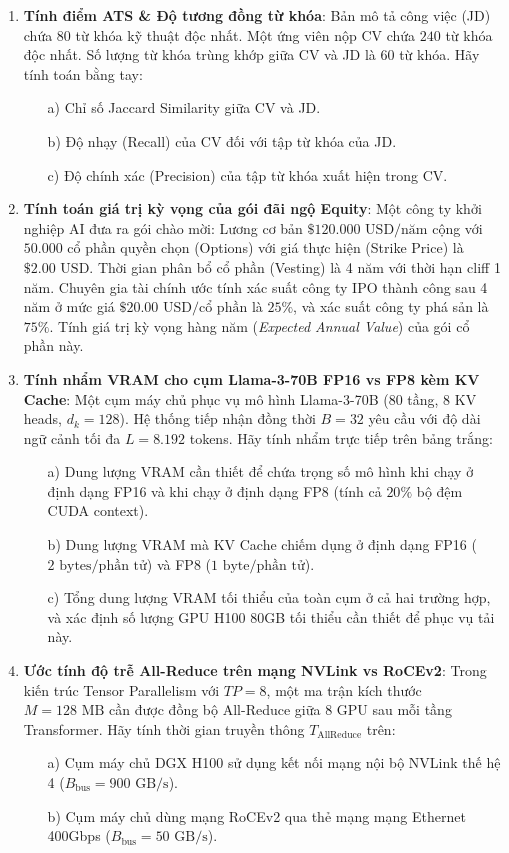 \begin{enumerate}[label=\textbf{B\arabic*.}]
  \item \textbf{Tính điểm ATS \& Độ tương đồng từ khóa}:
  Bản mô tả công việc (JD) chứa $80$ từ khóa kỹ thuật độc nhất.
  Một ứng viên nộp CV chứa $240$ từ khóa độc nhất. Số lượng từ khóa trùng khớp giữa CV và JD là $60$ từ khóa.
  Hãy tính toán bằng tay:
  \begin{itemize}
    \item[a)] Chỉ số Jaccard Similarity giữa CV và JD.
    \item[b)] Độ nhạy (Recall) của CV đối với tập từ khóa của JD.
    \item[c)] Độ chính xác (Precision) của tập từ khóa xuất hiện trong CV.
  \end{itemize}

  \item \textbf{Tính toán giá trị kỳ vọng của gói đãi ngộ Equity}:
  Một công ty khởi nghiệp AI đưa ra gói chào mời: Lương cơ bản $\$120.000\text{ USD/năm}$ cộng với $50.000$ cổ phần quyền chọn (Options) với giá thực hiện (Strike Price) là $\$2.00\text{ USD}$. Thời gian phân bổ cổ phần (Vesting) là 4 năm với thời hạn cliff 1 năm.
  Chuyên gia tài chính ước tính xác suất công ty IPO thành công sau 4 năm ở mức giá $\$20.00\text{ USD/cổ phần}$ là $25\%$, và xác suất công ty phá sản là $75\%$. Tính giá trị kỳ vọng hàng năm (\textit{Expected Annual Value}) của gói cổ phần này.

  \item \textbf{Tính nhẩm VRAM cho cụm Llama-3-70B FP16 vs FP8 kèm KV Cache}:
  Một cụm máy chủ phục vụ mô hình Llama-3-70B (80 tầng, 8 KV heads, $d_k = 128$).
  Hệ thống tiếp nhận đồng thời $B = 32$ yêu cầu với độ dài ngữ cảnh tối đa $L = 8.192$ tokens.
  Hãy tính nhẩm trực tiếp trên bảng trắng:
  \begin{itemize}
    \item[a)] Dung lượng VRAM cần thiết để chứa trọng số mô hình khi chạy ở định dạng FP16 và khi chạy ở định dạng FP8 (tính cả $20\%$ bộ đệm CUDA context).
    \item[b)] Dung lượng VRAM mà KV Cache chiếm dụng ở định dạng FP16 ($2\text{ bytes/phần tử}$) và FP8 ($1\text{ byte/phần tử}$).
    \item[c)] Tổng dung lượng VRAM tối thiểu của toàn cụm ở cả hai trường hợp, và xác định số lượng GPU H100 80GB tối thiểu cần thiết để phục vụ tải này.
  \end{itemize}

  \item \textbf{Ước tính độ trễ All-Reduce trên mạng NVLink vs RoCEv2}:
  Trong kiến trúc Tensor Parallelism với $TP = 8$, một ma trận kích thước $M = 128\text{ MB}$ cần được đồng bộ All-Reduce giữa 8 GPU sau mỗi tầng Transformer.
  Hãy tính thời gian truyền thông $T_{\text{AllReduce}}$ trên:
  \begin{itemize}
    \item[a)] Cụm máy chủ DGX H100 sử dụng kết nối mạng nội bộ NVLink thế hệ 4 ($B_{\text{bus}} = 900\text{ GB/s}$).
    \item[b)] Cụm máy chủ dùng mạng RoCEv2 qua thẻ mạng mạng Ethernet 400Gbps ($B_{\text{bus}} = 50\text{ GB/s}$).
  \end{itemize}


\end{enumerate}
